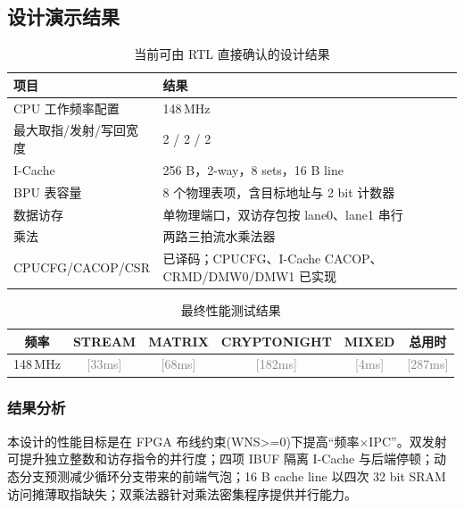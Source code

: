 \documentclass[UTF8,a4paper,zihao=5,fontset=none]{ctexart}
\newcommand{\grayfill}[1]{\textcolor{gray}{[#1]}}
\begin{document}
\subsection{设计演示结果}

\begin{table}[H]
  \centering
  \caption{当前可由 RTL 直接确认的设计结果}
  \begin{tabularx}{\textwidth}{p{4.2cm} X}
    \toprule
    项目               & 结果                                          \\
    \midrule
    CPU 工作频率配置       & 148\,MHz                                    \\
    最大取指/发射/写回宽度     & 2 / 2 / 2                                   \\
    I-Cache          & 256 B，2-way，8 sets，16 B line                \\
    BPU 表容量          & 8 个物理表项，含目标地址与 2 bit 计数器                    \\
    数据访存             & 单物理端口，双访存包按 lane0、lane1 串行                  \\
    乘法               & 两路三拍流水乘法器                                   \\
    CPUCFG/CACOP/CSR & 已译码；CPUCFG、I-Cache CACOP、CRMD/DMW0/DMW1 已实现 \\
    \bottomrule
  \end{tabularx}
\end{table}


\begin{table}[H]
  \centering
  \caption{最终性能测试结果}
  \begin{tabular}{c c c c c c}
    \toprule
    频率       & STREAM          & MATRIX          & CRYPTONIGHT      & MIXED          & 总用时              \\
    \midrule
    148\,MHz & \grayfill{33ms} & \grayfill{68ms} & \grayfill{182ms} & \grayfill{4ms} & \grayfill{287ms} \\
    \bottomrule
  \end{tabular}
\end{table}

\subsubsection{结果分析}

本设计的性能目标是在 FPGA 布线约束(WNS>=0)下提高“频率$\times$IPC”。双发射可提升独立整数和访存指令的并行度；四项 IBUF 隔离 I-Cache 与后端停顿；动态分支预测减少循环分支带来的前端气泡；16 B cache line 以四次 32 bit SRAM 访问摊薄取指缺失；双乘法器针对乘法密集程序提供并行能力。
\end{document}
